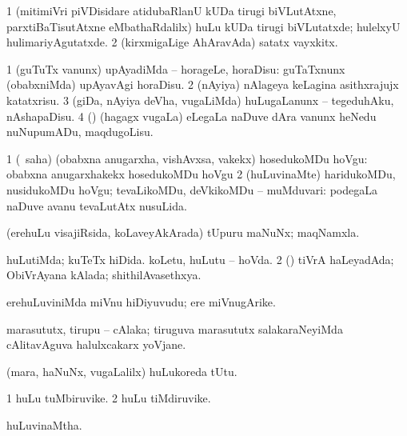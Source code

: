 \noindent
\gl{\pagu}
\expl{}
\bmng
\bnum
\num{1}  (mitimiVri piVDisidare atidubaRlanU kUDa tirugi biVLutAtxne, parxtiBaTisutAtxne eMbathaRdalilx) huLu kUDa tirugi biVLutatxde; hulelxyU hulimariyAgutatxde. 
\num{2}  (kirxmigaLige AhAravAda) satatx vayxkitx. 
\enum
\emng
\eentry

\bentry
{} 
\gl{\sakirx}
\expl{}
\bmng
\bnum
\num{1} (guTuTx \mo vanunx) upAyadiMda -- horageLe, horaDisu:  guTaTxnunx (obabxniMda) upAyavAgi horaDisu. 
\num{2} (nAyiya) nAlageya keLagina asithxrajujx katatxrisu. 
\num{3} (giDa, nAyiya deVha, \mo vugaLiMda) huLugaLanunx -- tegeduhAku, nAshapaDisu. 
\num{4} (\nw) (hagagx \mo vugaLa) eLegaLa naDuve dAra \mo vanunx heNedu nuNupumADu, maqdugoLisu. 
\enum
\emng

\noindent
\gl{\akirx}
\expl{}
\bmng
\bnum
\num{1} (\AtAmx\ saha) (obabxna anugarxha, vishAvxsa, \mo vakekx) hosedukoMDu hoVgu:  obabxna anugarxhakekx hosedukoMDu hoVgu 
\num{2} (huLuvinaMte) haridukoMDu, nusidukoMDu hoVgu; tevaLikoMDu, deVkikoMDu -- muMduvari:  podegaLa naDuve avanu tevaLutAtx nusuLida. 
\enum
\emng
\eentry

\bentry
{} 
\gl{\nA}
\expl{}
\bmng
(erehuLu visajiRsida, koLaveyAkArada) tUpuru maNuNx; maqNamxla. 
\emng
\eentry

\bentry
{} 
\gl{\gu}
\expl{}
\bmng
\bnum
{} 
\banum
{} huLutiMda; kuTeTx hiDida. 
 koLetu, huLutu -- hoVda. 
\eanum
\numie
\num{2} (\rUpa) tiVrA haLeyadAda; ObiVrAyana kAlada; shithilAvasethxya. 
\enum
\emng
\eentry

\bentry
{} 
\gl{\nA}
\expl{}
\bmng
erehuLuviniMda miVnu hiDiyuvudu; ere miVnugArike. 
\emng
\eentry

\bentry
{} 
\gl{\nA}
\expl{}
\bmng
marasututx, tirupu -- cAlaka; tiruguva marasututx salakaraNeyiMda cAlitavAguva halulxcakarx yoVjane. 
\emng
\eentry

\bentry
{} 
\gl{\nA}
\expl{}
\bmng
(mara, haNuNx, \mo vugaLalilx) huLukoreda tUtu. 
\emng
\eentry

\bentry
{} 
\gl{\nA}
\expl{}
\bmng
\bnum
\num{1} huLu tuMbiruvike. 
\num{2} huLu tiMdiruvike. 
\enum
\emng
\eentry

\bentry
{} 
\gl{\gu}
\expl{}
\bmng
huLuvinaMtha. 
\emng
\eentry

